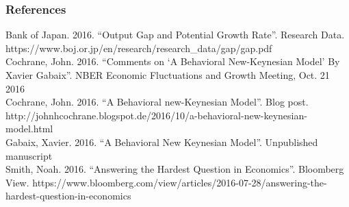 \documentclass{beamer}
\begin{document}
\begin{frame}
	\frametitle{References}
\begin{flushleft}
\footnotesize
		Bank of Japan. 2016. ``Output Gap and Potential Growth Rate''. Research Data. https://www.boj.or.jp/en/research/research\_data/gap/gap.pdf\\
		\vspace{7pt}
		Cochrane, John. 2016. ``Comments on `A Behavioral New-Keynesian Model' By Xavier Gabaix''. NBER Economic Fluctuations and Growth Meeting, Oct. 21 2016\\ 
		\vspace{7pt}
		Cochrane, John. 2016. ``A Behavioral new-Keynesian Model''. Blog post. http://johnhcochrane.blogspot.de/2016/10/a-behavioral-new-keynesian-model.html\\
		\vspace{7pt}
		Gabaix, Xavier. 2016. ``A Behavioral New Keynesian Model''. Unpublished manuscript\\
		\vspace{7pt}
		Smith, Noah. 2016. ``Answering the Hardest Question in Economics''. Bloomberg View. https://www.bloomberg.com/view/articles/2016-07-28/answering-the-hardest-question-in-economics
\end{flushleft}
\end{frame}

\end{document}
